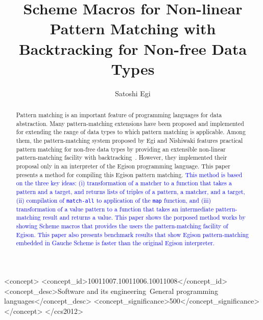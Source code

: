 \documentclass[acmlarge]{acmart}
\newcommand{\new}[1]{\textcolor{blue}{#1}}
\begin{document}
\setlength{\pdfpageheight}{\paperheight}
\setlength{\pdfpagewidth}{\paperwidth}

\title{Scheme Macros for Non-linear Pattern Matching with Backtracking for Non-free Data Types}

\author{Satoshi Egi}

\begin{abstract}
  Pattern matching is an important feature of programming languages for data abstraction.
  Many pattern-matching extensions have been proposed and implemented for extending the range of data types to which pattern matching is applicable.
  Among them, the pattern-matching system proposed by Egi and Nishiwaki features practical pattern matching for non-free data types by providing an extensible non-linear pattern-matching facility with backtracking~\cite{egi2018aplas}.
  However, they implemented their proposal only in an interpreter of the Egison programming language.
  This paper presents a method for compiling this Egison pattern matching.
  \new{
  This method is based on the three key ideas: (i) transformation of a matcher to a function that takes a pattern and a target, and returns lists of triples of a pattern, a matcher, and a target, (ii) compilation of \texttt{match-all} to application of the \texttt{map} function, and (iii) transformation of a value pattern to a function that takes an intermediate pattern-matching result and returns a value.
  This paper shows the porposed method works by showing Scheme macros that provides the users the pattern-matching facility of Egison.
  This paper also presents benchmark results that show Egison pattern-matching embedded in Gauche Scheme is faster than the original Egison interpreter.
  }%
\end{abstract}

\begin{CCSXML}
<concept>
<concept_id>10011007.10011006.10011008</concept_id>
<concept_desc>Software and its engineering~General programming languages</concept_desc>
<concept_significance>500</concept_significance>
</concept>
</ccs2012>
\end{CCSXML}

\end{document}
